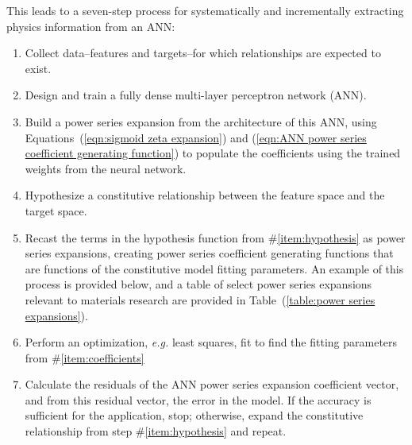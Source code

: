 
This leads to a seven-step process for systematically and incrementally extracting physics information from an ANN:
\begin{enumerate}
	\item Collect data--features and targets--for which relationships are expected to exist.
	\item Design and train a fully dense multi-layer perceptron network (ANN).
	\item Build a power series expansion from the architecture of this ANN, using Equations~(\ref{eqn:sigmoid zeta expansion}) and (\ref{eqn:ANN power series coefficient generating function}) to populate the coefficients using the trained weights from the neural network.
	\item Hypothesize a constitutive relationship between the feature space and the target space. \label{item:hypothesis}
	\item Recast the terms in the hypothesis function from \#\ref{item:hypothesis} as power series expansions, creating power series coefficient generating functions that are functions of the constitutive model fitting parameters. An example of this process is provided below, and a table of select power series expansions relevant to materials research are provided in Table~(\ref{table:power series expansions}). \label{item:coefficients}
	\item Perform an optimization, \emph{e.g.} least squares, fit to find the fitting parameters from \#\ref{item:coefficients}
	\item Calculate the residuals of the ANN power series expansion coefficient vector, and from this residual vector, the error in the model. If the accuracy is sufficient for the application, stop; otherwise, expand the constitutive relationship from step \#\ref{item:hypothesis} and repeat.
\end{enumerate}




